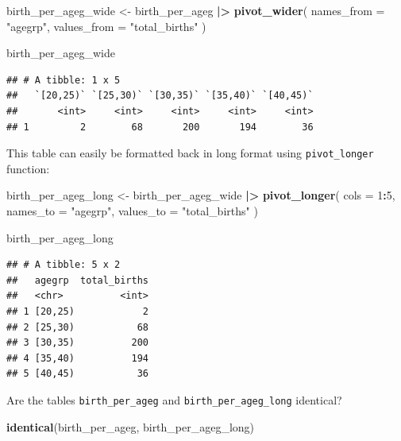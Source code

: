 \documentclass[
]{book}
\newenvironment{Shaded}{\begin{snugshade}}{\end{snugshade}}
\newcommand{\AttributeTok}[1]{\textcolor[rgb]{0.13,0.29,0.53}{#1}}
\newcommand{\DecValTok}[1]{\textcolor[rgb]{0.00,0.00,0.81}{#1}}
\newcommand{\FunctionTok}[1]{\textcolor[rgb]{0.13,0.29,0.53}{\textbf{#1}}}
\newcommand{\NormalTok}[1]{#1}
\newcommand{\OtherTok}[1]{\textcolor[rgb]{0.56,0.35,0.01}{#1}}
\newcommand{\SpecialCharTok}[1]{\textcolor[rgb]{0.81,0.36,0.00}{\textbf{#1}}}
\newcommand{\StringTok}[1]{\textcolor[rgb]{0.31,0.60,0.02}{#1}}
\begin{document}
\begin{Shaded}
\begin{Highlighting}[]
\NormalTok{birth\_per\_ageg\_wide }\OtherTok{\textless{}{-}}
\NormalTok{  birth\_per\_ageg }\SpecialCharTok{|\textgreater{}}
  \FunctionTok{pivot\_wider}\NormalTok{(}
    \AttributeTok{names\_from =} \StringTok{"agegrp"}\NormalTok{, }
    \AttributeTok{values\_from =} \StringTok{"total\_births"}
\NormalTok{  )}

\NormalTok{birth\_per\_ageg\_wide}
\end{Highlighting}
\end{Shaded}

\begin{verbatim}
## # A tibble: 1 x 5
##   `[20,25)` `[25,30)` `[30,35)` `[35,40)` `[40,45)`
##       <int>     <int>     <int>     <int>     <int>
## 1         2        68       200       194        36
\end{verbatim}

This table can easily be formatted back in long format using \texttt{pivot\_longer} function:

\begin{Shaded}
\begin{Highlighting}[]
\NormalTok{birth\_per\_ageg\_long }\OtherTok{\textless{}{-}}
\NormalTok{  birth\_per\_ageg\_wide }\SpecialCharTok{|\textgreater{}}
  \FunctionTok{pivot\_longer}\NormalTok{(}
    \AttributeTok{cols =} \DecValTok{1}\SpecialCharTok{:}\DecValTok{5}\NormalTok{, }
    \AttributeTok{names\_to =} \StringTok{"agegrp"}\NormalTok{, }
    \AttributeTok{values\_to =} \StringTok{"total\_births"}
\NormalTok{  )}

\NormalTok{birth\_per\_ageg\_long}
\end{Highlighting}
\end{Shaded}

\begin{verbatim}
## # A tibble: 5 x 2
##   agegrp  total_births
##   <chr>          <int>
## 1 [20,25)            2
## 2 [25,30)           68
## 3 [30,35)          200
## 4 [35,40)          194
## 5 [40,45)           36
\end{verbatim}

Are the tables \texttt{birth\_per\_ageg} and \texttt{birth\_per\_ageg\_long} identical?

\begin{Shaded}
\begin{Highlighting}[]
\FunctionTok{identical}\NormalTok{(birth\_per\_ageg, birth\_per\_ageg\_long)}
\end{Highlighting}
\end{Shaded}
\end{document}
